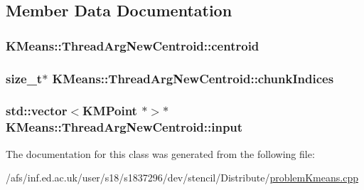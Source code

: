 \subsection{Member Data Documentation}
\hypertarget{classKMeans_1_1ThreadArgNewCentroid_a3c916ccdf617487a5b91578572241a36}{
\subsubsection[{centroid}]{ K\-Means\-::\-Thread\-Arg\-New\-Centroid\-::centroid}}\label{classKMeans_1_1ThreadArgNewCentroid_a3c916ccdf617487a5b91578572241a36}
\hypertarget{classKMeans_1_1ThreadArgNewCentroid_ac026174de7fc8a7ca4a0c5b20b9e971d}{
\subsubsection[{chunk\-Indices}]{\setlength{\rightskip}{0pt plus 5cm}size\-\_\-t$\ast$ K\-Means\-::\-Thread\-Arg\-New\-Centroid\-::chunk\-Indices}}\label{classKMeans_1_1ThreadArgNewCentroid_ac026174de7fc8a7ca4a0c5b20b9e971d}
\hypertarget{classKMeans_1_1ThreadArgNewCentroid_afefa482db4fb35d1f498fec601aaa5e3}{
\subsubsection[{input}]{\setlength{\rightskip}{0pt plus 5cm}std\-::vector$<${\bf K\-M\-Point} $\ast$$>$$\ast$ K\-Means\-::\-Thread\-Arg\-New\-Centroid\-::input}}\label{classKMeans_1_1ThreadArgNewCentroid_afefa482db4fb35d1f498fec601aaa5e3}


The documentation for this class was generated from the following file\-:\begin{DoxyCompactItemize}
\item 
/afs/inf.\-ed.\-ac.\-uk/user/s18/s1837296/dev/stencil/\-Distribute/\hyperlink{problemKmeans_8cpp}{problem\-Kmeans.\-cpp}\end{DoxyCompactItemize}
